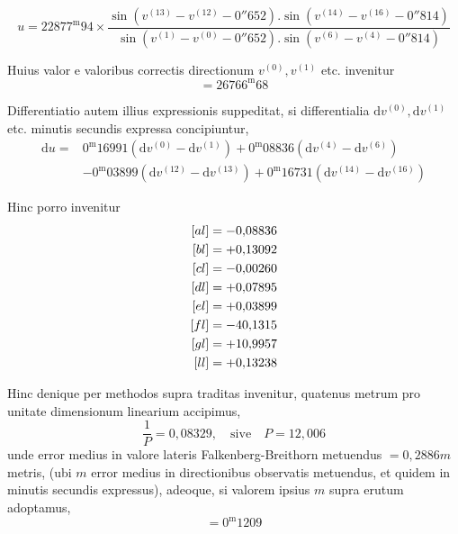 \[
u=22877^{\mathrm m}94\times\frac{\sin(v^{(13)}-v^{(12)}-0''652).\sin(v^{(14)}-v^{(16)}-0''814)}{\sin(v^{(1)}-v^{(0)}-0''652).\sin(v^{(6)}-v^{(4)}-0''814)}
\]

Huius valor e valoribus correctis directionum \(v^{(0)},v^{(1)}\) etc. invenitur
\[
=26766^{\mathrm m}68
\]

Differentiatio autem illius expressionis suppeditat, si differentialia \(\mathrm dv^{(0)},\allowbreak\mathrm dv^{(1)}\) etc. minutis secundis expressa concipiuntur,
\[
\begin{aligned}
\mathrm du={}&0^{\mathrm m}16991(\mathrm dv^{(0)}-\mathrm dv^{(1)})+0^{\mathrm m}08836(\mathrm dv^{(4)}-\mathrm dv^{(6)})\\
&-0^{\mathrm m}03899(\mathrm dv^{(12)}-\mathrm dv^{(13)})+0^{\mathrm m}16731(\mathrm dv^{(14)}-\mathrm dv^{(16)})
\end{aligned}
\]

Hinc porro invenitur
\[
\begin{aligned}\relax
[al]&=-0{,}08836\\
[bl]&=+0{,}13092\\
[cl]&=-0{,}00260\\
[dl]&=+0{,}07895\\
[el]&=+0{,}03899\\
[fl]&=-40{,}1315\\
[gl]&=+10{,}9957\\
[ll]&=+0{,}13238
\end{aligned}
\]

Hinc denique per methodos supra traditas invenitur, quatenus metrum pro unitate dimensionum linearium accipimus,
\[
\frac1P=0{,}08329,\quad\text{sive}\quad P=12{,}006
\]
unde error medius in valore lateris Falkenberg-Breithorn metuendus \(=0{,}2886m\) metris, (ubi \(m\) error medius in directionibus observatis metuendus, et quidem in minutis secundis expressus), adeoque, si valorem ipsius \(m\) supra erutum adoptamus,
\[
=0^{\mathrm m}1209
\]

